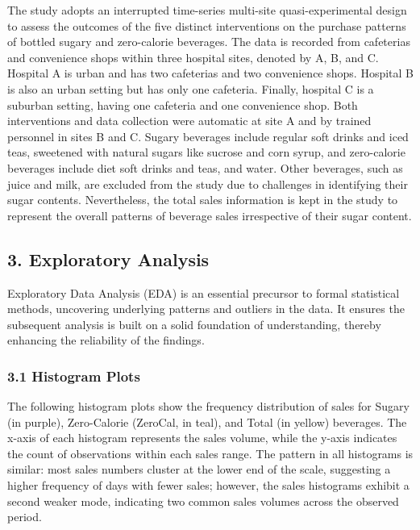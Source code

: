 \documentclass[
]{article}
\begin{document}
The study adopts an interrupted time-series multi-site
quasi-experimental design to assess the outcomes of the five distinct
interventions on the purchase patterns of bottled sugary and
zero-calorie beverages. The data is recorded from cafeterias and
convenience shops within three hospital sites, denoted by A, B, and C.
Hospital A is urban and has two cafeterias and two convenience shops.
Hospital B is also an urban setting but has only one cafeteria. Finally,
hospital C is a suburban setting, having one cafeteria and one
convenience shop. Both interventions and data collection were automatic
at site A and by trained personnel in sites B and C. Sugary beverages
include regular soft drinks and iced teas, sweetened with natural sugars
like sucrose and corn syrup, and zero-calorie beverages include diet
soft drinks and teas, and water. Other beverages, such as juice and
milk, are excluded from the study due to challenges in identifying their
sugar contents. Nevertheless, the total sales information is kept in the
study to represent the overall patterns of beverage sales irrespective
of their sugar content.

\hypertarget{exploratory-analysis}{%
\subsection{3. Exploratory Analysis}\label{exploratory-analysis}}

Exploratory Data Analysis (EDA) is an essential precursor to formal
statistical methods, uncovering underlying patterns and outliers in the
data. It ensures the subsequent analysis is built on a solid foundation
of understanding, thereby enhancing the reliability of the findings.

\hypertarget{histogram-plots}{%
\subsubsection{3.1 Histogram Plots}\label{histogram-plots}}

The following histogram plots show the frequency distribution of sales
for Sugary (in purple), Zero-Calorie (ZeroCal, in teal), and Total (in
yellow) beverages. The x-axis of each histogram represents the sales
volume, while the y-axis indicates the count of observations within each
sales range. The pattern in all histograms is similar: most sales
numbers cluster at the lower end of the scale, suggesting a higher
frequency of days with fewer sales; however, the sales histograms
exhibit a second weaker mode, indicating two common sales volumes across
the observed period.
\end{document}
